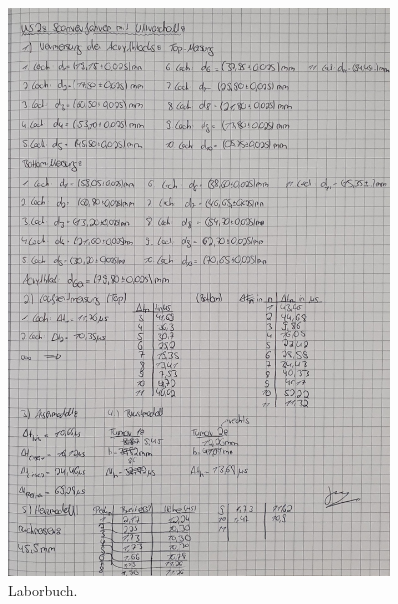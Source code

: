 \begin{figure}
    \centering
    \includegraphics[width=0.9\textwidth]{content/20240521_115402.jpg}
    \caption{Laborbuch.}
\end{figure}




%
